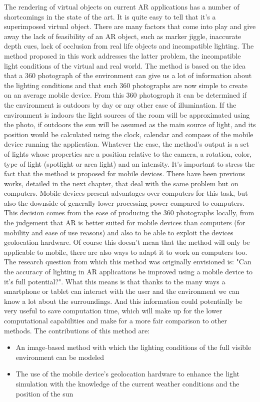 
The rendering of virtual objects on current AR applications has a number of shortcomings in the state of the art. It is quite easy to tell that it’s a superimposed virtual object. There are many factors that come into play and give away the lack of feasibility of an AR object, such as marker jiggle, inaccurate depth cues, lack of occlusion from real life objects and incompatible lighting.
The method proposed in this work addresses the latter problem, the incompatible light conditions of the virtual and real world. The method is based on the idea that a 360 photograph of the environment can give us a lot of information about the lighting conditions and that such 360 photographs are now simple to create on an average mobile device. From this 360 photograph it can be determined if the environment is outdoors by day or any other case of illumination. If the environment is indoors the light sources of the room will be approximated using the photo, if outdoors the sun will be assumed as the main source of light, and its position would be calculated using the clock, calendar and compass of the mobile device running the application. \newline
Whatever the case, the method's output is a set of lights whose properties are a position relative to the camera, a rotation, color, type of light (spotlight or area light) and an intensity.
It's important to stress the fact that the method is proposed for mobile devices. There have been previous works, detailed in the next chapter, that deal with the same problem but on computers. Mobile devices present advantages over computers for this task, but also the downside of generally lower processing power compared to computers. This decision comes from the ease of producing the 360 photographs locally, from the judgement that AR is better suited for mobile devices than computers (for mobility and ease of use reasons) and also to be able to exploit the devices geolocation hardware. Of course this doesn't mean that the method will only be applicable to mobile, there are also ways to adapt it to work on computers too.\newline
The research question from which this method was originally envisioned is: "Can the accuracy of lighting in AR applications be improved using a mobile device to it's full potential?". What this means is that thanks to the many ways a smartphone or tablet can interact with the user and the environment we can know a lot about the surroundings. And this information could potentially be very useful to save computation time, which will make up for the lower computational capabilities and make for a more fair comparison to other methods.\newline
The contributions of this method are:
\begin{itemize}
    \item An image-based method with which the lighting conditions of the full visible environment can be modeled
    \item The use of the mobile device's geolocation hardware to enhance the light simulation with the knowledge of the current weather conditions and the position of the sun
\end{itemize}
